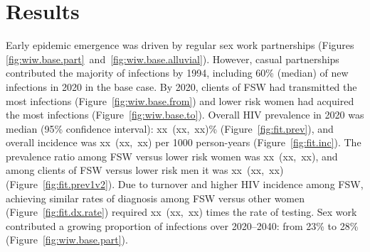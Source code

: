 \section{Results}\label{res}
\newcommand{\xci}[1]{xx~(xx,~xx)\xspace}
Early epidemic emergence was driven by regular sex work partnerships
(Figures \ref{fig:wiw.base.part}~and~\ref{fig:wiw.base.alluvial}).
However, casual partnerships contributed the majority of infections by 1994, %
including 60\% (median) of new infections in 2020 in the base case. %
By 2020, clients of FSW had transmitted the most infections (Figure~\ref{fig:wiw.base.from})
and lower risk women had acquired the most infections (Figure~\ref{fig:wiw.base.to}).
Overall HIV prevalence in 2020 was median (95\% confidence interval):
\xci{bc/prev.all.2020}\% (Figure~\ref{fig:fit.prev}),
and overall incidence was \xci{bc/inc.all.2020} per 1000 person-years (Figure~\ref{fig:fit.inc}).
The prevalence ratio among FSW versus lower risk women was \xci{bc/pr.fsw.2020},
and among clients of FSW versus lower risk men it was \xci{bc/pr.cli.2020} (Figure~\ref{fig:fit.prev1v2}).
Due to turnover and higher HIV incidence among FSW,
achieving similar rates of diagnosis among FSW versus other women (Figure~\ref{fig:fit.dx.rate})
required \xci{Rdx.fsw} times the rate of testing.
Sex work contributed a growing proportion of infections
over 2020--2040: from 23\% to 28\% (Figure~\ref{fig:wiw.base.part}). %
